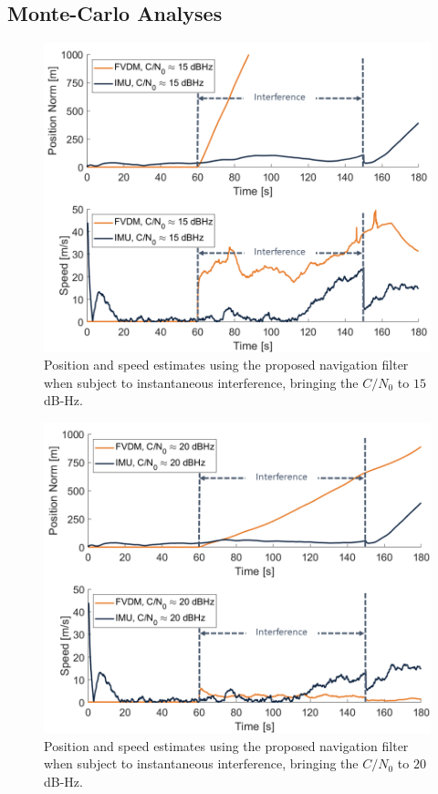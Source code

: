 \subsection{\textbf{Monte-Carlo Analyses}}
\begin{figure}[!ht]
    \centering
    \includegraphics[width=0.75\linewidth]{Figures/Results/trajectoryfigure/Slide14.PNG}
    \caption{Position and speed estimates using the proposed navigation filter when subject to instantaneous interference, bringing the \(C/N_0\) to \(15\) dB-Hz.}\label{fig:PosVel15}
\end{figure}

\begin{figure}[!ht]
    \centering
    \includegraphics[width=0.75\linewidth]{Figures/Results/trajectoryfigure/Slide15.PNG}
    \caption{Position and speed estimates using the proposed navigation filter when subject to instantaneous interference, bringing the \(C/N_0\) to \(20\) dB-Hz.}\label{fig:PosVel20}
\end{figure}

